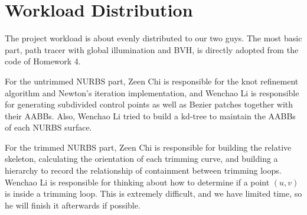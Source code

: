 \documentclass[acmtog]{acmart}
\begin{document}
\section{Workload Distribution}
\hspace*{8pt}
The project workload is about evenly distributed to our two guys. The most basic part, path tracer with global illumination and BVH, is directly adopted from the code of Homework 4.

For the untrimmed NURBS part, Zeen Chi is responsible for the knot refinement algorithm and Newton's iteration implementation, and Wenchao Li is responsible for generating subdivided control points as well as Bezier patches together with their AABBs. Also, Wenchao Li tried to build a kd-tree to maintain the AABBs of each NURBS surface.

For the trimmed NURBS part, Zeen Chi is responsible for building the relative skeleton, calculating the orientation of each trimming curve, and building a hierarchy to record the relationship of containment between trimming loops. Wenchao Li is responsible for thinking about how to determine if a point $(u,v)$ is inside a trimming loop. This is extremely difficult, and we have limited time, so he will finish it afterwards if possible.
\end{document}
